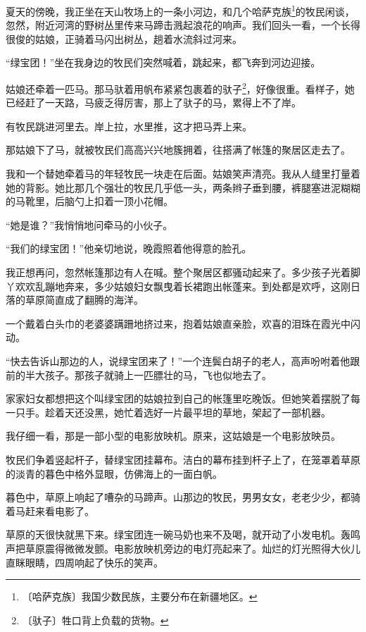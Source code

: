 \documentclass[12pt,UTF-8,openany]{ctexbook}
\begin{document}
\begin{large}
    
    夏天的傍晚，我正坐在天山牧场上的一条小河边，和几个哈萨克族\footnote{〔哈萨克族〕我国少数民族，主要分布在新疆地区。}的牧民闲谈，忽然，附近河湾的野树丛里传来马蹄击溅起浪花的响声。我们回头一看，一个长得很俊的姑娘，正骑着马闪出树丛，趟着水流斜过河来。
    
    “绿宝团！”坐在我身边的牧民们突然喊着，跳起来，都飞奔到河边迎接。
    
    姑娘还牵着一匹马。那马驮着用帆布紧紧包裹着的驮子\footnote{〔驮子〕牲口背上负载的货物。}，好像很重。看样子，她已经赶了一天路，马疲乏得厉害，那上了驮子的马，累得上不了岸。
    
    有牧民跳进河里去。岸上拉，水里推，这才把马弄上来。
    
    那姑娘下了马，就被牧民们高高兴兴地簇拥着，往搭满了帐篷的聚居区走去了。
    
    我和一个替她牵着马的年轻牧民一块走在后面。姑娘笑声清亮。我从人缝里打量着她的背影。她比那几个强壮的牧民几乎低一头，两条辫子垂到腰，裤腿塞进泥糊糊的马靴里，后脑勺上扣着一顶小花帽。
    
    “她是谁？”我悄悄地问牵马的小伙子。
    
    “我们的绿宝团！”他亲切地说，晚霞照着他得意的脸孔。
    
    我正想再问，忽然帐篷那边有人在喊。整个聚居区都骚动起来了。多少孩子光着脚丫欢欢乱蹦地奔来，多少姑娘妇女飘曳着长裙跑出帐蓬来。到处都是欢呼，这刚日落的草原简直成了翻腾的海洋。
    
    一个戴着白头巾的老婆婆蹒跚地挤过来，抱着姑娘直亲脸，欢喜的泪珠在霞光中闪动。
    
    “快去告诉山那边的人，说绿宝团来了！”一个连鬓白胡子的老人，高声吩咐着他跟前的半大孩子。那孩子就骑上一匹膘壮的马，飞也似地去了。
    
    家家妇女都想把这个叫绿宝团的姑娘拉到自己的帐篷里吃晚饭。但她笑着摆脱了每一只手。趁着天还没黑，她忙着选好一片最平坦的草地，架起了一部机器。
    
    我仔细一看，那是一部小型的电影放映机。原来，这姑娘是一个电影放映员。
    
    牧民们争着竖起杆子，替绿宝团挂幕布。洁白的幕布挂到杆子上了，在笼罩着草原的淡青的暮色中格外显眼，仿佛海上的一面白帆。
    
    暮色中，草原上响起了嘈杂的马蹄声。山那边的牧民，男男女女，老老少少，都骑着马赶来看电影了。
    
    草原的天很快就黑下来。绿宝团连一碗马奶也来不及喝，就开动了小发电机。轰鸣声把草原震得微微发颤。电影放映机旁边的电灯亮起来了。灿烂的灯光照得大伙儿直眯眼睛，四周响起了快乐的笑声。
    

\end{large}
\end{document}
